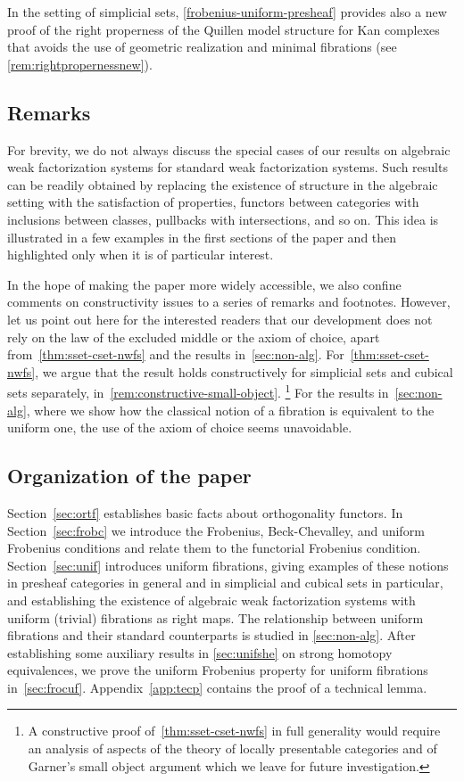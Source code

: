 \documentclass[reqno,10pt,a4paper,oneside,draft]{amsart}
\begin{document}
In the setting of simplicial sets, \cref{frobenius-uniform-presheaf} provides also a new proof of the right properness of the Quillen model structure for Kan complexes that avoids the use of geometric realization and minimal fibrations (see \cref{rem:rightpropernessnew}).

\subsection*{Remarks}

For brevity, we do not always discuss the special cases of our results on algebraic weak factorization systems for standard weak factorization systems.
Such results can be readily obtained by replacing the existence of structure in the algebraic setting with the satisfaction of properties, functors between categories with inclusions between classes, pullbacks with intersections, and so on.
This idea is illustrated in a few examples in the first sections of the paper and then highlighted only when it is of particular interest.

In the hope of making the paper more widely accessible, we also confine comments on constructivity issues to a series of remarks and footnotes.
However, let us point out here for the interested readers that our development does not rely on the law of the excluded middle or the axiom of choice, apart from~\cref{thm:sset-cset-nwfs} and the results in~\cref{sec:non-alg}.
For~\cref{thm:sset-cset-nwfs}, we argue that the result holds constructively for simplicial sets and cubical sets separately, in~\cref{rem:constructive-small-object}.%
\footnote{A constructive proof of~\cref{thm:sset-cset-nwfs} in full generality would require an analysis of aspects of the theory of locally presentable categories and of Garner's small object argument which we leave for future investigation.}
For the results in~\cref{sec:non-alg}, where we show how the classical notion of a fibration is equivalent to the uniform one, the use of the axiom of choice seems unavoidable.

\subsection*{Organization of the paper}

Section~\ref{sec:ortf} establishes basic facts about orthogonality functors.
In Section~\ref{sec:frobc} we introduce the Frobenius, Beck-Chevalley, and uniform Frobenius conditions and relate them to the functorial Frobenius condition.
Section~\ref{sec:unif} introduces uniform fibrations, giving examples of these notions in presheaf categories in general and in simplicial and cubical sets in particular, and establishing the existence of algebraic weak factorization systems with uniform (trivial) fibrations as right maps.
The relationship between uniform fibrations and their standard counterparts is studied in \cref{sec:non-alg}.
After establishing some auxiliary results in \cref{sec:unifshe} on strong homotopy equivalences, we prove the uniform Frobenius property for uniform fibrations in~\cref{sec:frocuf}.
Appendix~\ref{app:tecp} contains the proof of a technical lemma.
\end{document}
